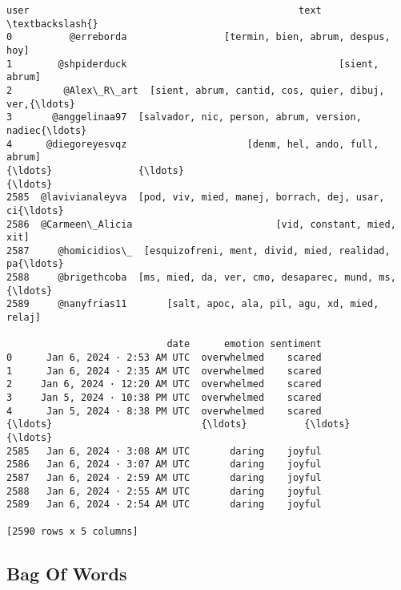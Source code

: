 \documentclass[11pt]{article}
\makeatletter
\newcommand{\boxspacing}{\kern\kvtcb@left@rule\kern\kvtcb@boxsep}
\newcommand{\prompt}[4]{
        {\ttfamily\llap{{\color{#2}[#3]:\hspace{3pt}#4}}\vspace{-\baselineskip}}
    }
\makeatother
\begin{document}
            \begin{tcolorbox}[breakable, size=fbox, boxrule=.5pt, pad at break*=1mm, opacityfill=0]
\prompt{Out}{outcolor}{194}{\boxspacing}
\begin{Verbatim}[commandchars=\\\{\}]
                 user                                               text  \textbackslash{}
0          @erreborda                 [termin, bien, abrum, despus, hoy]
1        @shpiderduck                                     [sient, abrum]
2         @Alex\_R\_art  [sient, abrum, cantid, cos, quier, dibuj, ver,{\ldots}
3       @anggelinaa97  [salvador, nic, person, abrum, version, nadiec{\ldots}
4      @diegoreyesvqz                     [denm, hel, ando, full, abrum]
{\ldots}               {\ldots}                                                {\ldots}
2585  @lavivianaleyva  [pod, viv, mied, manej, borrach, dej, usar, ci{\ldots}
2586  @Carmeen\_Alicia                         [vid, constant, mied, xit]
2587     @homicidios\_  [esquizofreni, ment, divid, mied, realidad, pa{\ldots}
2588     @brigethcoba  [ms, mied, da, ver, cmo, desaparec, mund, ms, {\ldots}
2589     @nanyfrias11       [salt, apoc, ala, pil, agu, xd, mied, relaj]

                            date      emotion sentiment
0      Jan 6, 2024 · 2:53 AM UTC  overwhelmed    scared
1      Jan 6, 2024 · 2:35 AM UTC  overwhelmed    scared
2     Jan 6, 2024 · 12:20 AM UTC  overwhelmed    scared
3     Jan 5, 2024 · 10:38 PM UTC  overwhelmed    scared
4      Jan 5, 2024 · 8:38 PM UTC  overwhelmed    scared
{\ldots}                          {\ldots}          {\ldots}       {\ldots}
2585   Jan 6, 2024 · 3:08 AM UTC       daring    joyful
2586   Jan 6, 2024 · 3:07 AM UTC       daring    joyful
2587   Jan 6, 2024 · 2:59 AM UTC       daring    joyful
2588   Jan 6, 2024 · 2:55 AM UTC       daring    joyful
2589   Jan 6, 2024 · 2:54 AM UTC       daring    joyful

[2590 rows x 5 columns]
\end{Verbatim}
\end{tcolorbox}
        
    \hypertarget{bag-of-words}{%
\subsection{Bag Of Words}\label{bag-of-words}}
\end{document}
